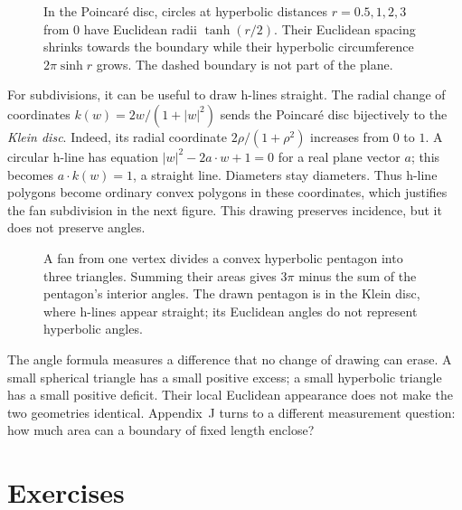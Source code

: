 \begin{figure}[ht]
\centering
{}
\caption{In the Poincar\'e disc, circles at hyperbolic distances $r=0.5,1,2,3$ from $0$ have Euclidean radii $\tanh(r/2)$. Their Euclidean spacing shrinks towards the boundary while their hyperbolic circumference $2\pi\sinh r$ grows. The dashed boundary is not part of the plane.}
\label{geometry:fig:v9-polar-circles}
\end{figure}

For subdivisions, it can be useful to draw h-lines straight. The radial change
of coordinates $k(w)=2w/(1+|w|^2)$ sends the Poincar\'e disc bijectively
to the \emph{Klein disc}. Indeed, its radial coordinate $2\rho/(1+\rho^2)$
increases from $0$ to $1$. A circular h-line has equation
$|w|^2-2a\cdot w+1=0$ for a real plane vector $a$; this becomes
$a\cdot k(w)=1$, a straight line. Diameters stay diameters.
Thus h-line polygons become ordinary convex polygons in these coordinates,
which justifies the fan subdivision in the next figure. This drawing
preserves incidence, but it does not preserve angles.

\begin{figure}[ht]
\centering
{}
\caption{A fan from one vertex divides a convex hyperbolic pentagon into three triangles. Summing their areas gives $3\pi$ minus the sum of the pentagon's interior angles. The drawn pentagon is in the Klein disc, where h-lines appear straight; its Euclidean angles do not represent hyperbolic angles.}
\label{geometry:fig:v9-triangle-area}
\end{figure}

The angle formula measures a difference that no change of drawing can erase.
A small spherical triangle has a small positive excess; a small hyperbolic
triangle has a small positive deficit. Their local Euclidean appearance does
not make the two geometries identical. Appendix~J turns to a different
measurement question: how much area can a boundary of fixed length enclose?

\section{Exercises}

